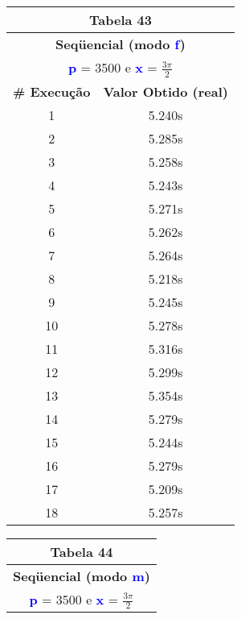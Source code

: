 \documentclass[11pt]{article}
\begin{document}
\begin{table}[!h]
	\begin{center}
		\begin{minipage}{0.48\textwidth}
			\begin{tabular}{| c | c |}
			\hline
			\multicolumn{2}{|c|}{\textbf{Tabela 43}} \\ \hline
			\multicolumn{2}{|c|}{\textbf{Seqüencial (modo \textbf{\textcolor{blue}{f}})}} \\
			\multicolumn{2}{|c|}{\textbf{\textcolor{blue}{p}} = 3500 e \textbf{\textcolor{blue}{x}} = $\frac{3\pi}{2}$} \\ [0.2ex]
			\hline
				\textbf{\# Execução} &  \textbf{Valor Obtido (real)} \\ \hline
				1 & 5.240s \\ \hline
				2 & 5.285s \\ \hline
				3 & 5.258s \\ \hline
				4 & 5.243s \\ \hline
				5 & 5.271s \\ \hline
				6 & 5.262s \\ \hline
				7 & 5.264s \\ \hline
				8 & 5.218s \\ \hline
				9 & 5.245s \\ \hline
				10 & 5.278s \\ \hline
				11 & 5.316s \\ \hline
				12 & 5.299s \\ \hline
				13 & 5.354s \\ \hline
				14 & 5.279s \\ \hline
				15 & 5.244s \\ \hline
				16 & 5.279s \\ \hline
				17 & 5.209s \\ \hline
				18 & 5.257s \\ \hline
			\end{tabular}
		\end{minipage}
		\begin{minipage}{0.48\textwidth}
			\begin{tabular}{| c | c |}
			\hline
			\multicolumn{2}{|c|}{\textbf{Tabela 44}} \\ \hline
			\multicolumn{2}{|c|}{\textbf{Seqüencial (modo \textbf{\textcolor{blue}{m}})}} \\
			\multicolumn{2}{|c|}{\textbf{\textcolor{blue}{p}} = 3500 e \textbf{\textcolor{blue}{x}} = $\frac{3\pi}{2}$} \\ [0.2ex]
			\hline

\end{tabular}
\end{minipage}
\end{center}
\end{table}
\end{document}
